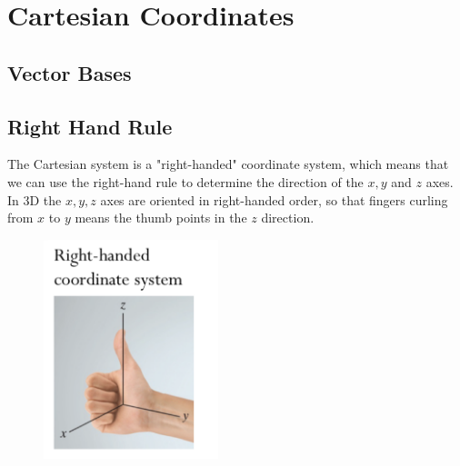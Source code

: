 \section{Cartesian Coordinates}


\subsection{Vector Bases}


\subsection{Right Hand Rule}

The Cartesian system is a "right-handed" coordinate system, which means that we can use the right-hand rule to determine the direction of the $x, y$ and $z$ axes. In 3D the $x, y, z$ axes are oriented in right-handed order, so that fingers curling from $x$ to $y$ means the thumb points in the $z$ direction.

\begin{figure}[!h]
\centering
\includegraphics[angle=0, width=2in]{CartCoordFigures/RightHandRule.png}
\vspace{-2mm}
\caption{\small {}}
\vspace{-3mm}
\label{Fig:NewtonsLaws}
\end{figure}


